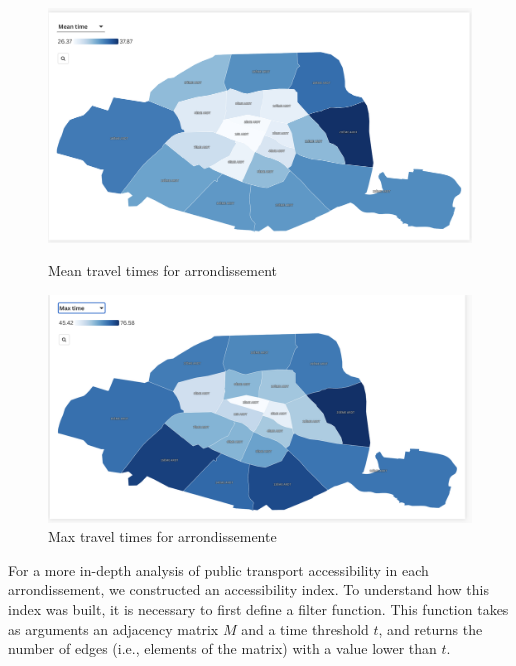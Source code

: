 \documentclass[a4paper,12pt]{article}
\begin{document}
\begin{figure}[h!]
	\centering
	\begin{minipage}{0.48\textwidth}
		\centering
		\includegraphics[width=\linewidth]{images/flourish_map_mean.png} %
		\caption{Mean travel times for arrondissement}
		\label{fig:immagine1}
	\end{minipage}\hfill
	\begin{minipage}{0.48\textwidth}
		\centering
		\includegraphics[width=\linewidth]{images/flourish_map_max.png} %
		\caption{Max travel times for arrondissemente}
		\label{fig:immagine2}
	\end{minipage}
\end{figure}

For a more in-depth analysis of public transport accessibility in each arrondissement, we constructed an accessibility index. To understand how this index was built, it is necessary to first define a filter function. This function takes as arguments an adjacency matrix $M$  and a time threshold $t$, and returns the number of edges (i.e., elements of the matrix) with a value lower than $t$.
\end{document}
